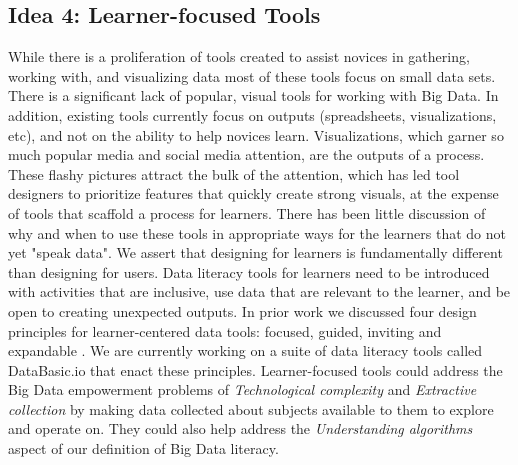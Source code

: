 \documentclass{sig-alternate}
\begin{document}
\subsection{Idea 4: Learner-focused Tools}
While there is a proliferation of tools created to assist novices in gathering, working with, and visualizing data \cite{tachtech_visualizing_2014,netstories_2015} most of these tools focus on small data sets. There is a significant lack of popular, visual tools for working with Big Data. In addition, existing tools currently focus on outputs (spreadsheets, visualizations, etc), and not on the ability to help novices learn. Visualizations, which garner so much popular media and social media attention, are the outputs of a process. These flashy pictures attract the bulk of the attention, which has led tool designers to prioritize features that quickly create strong visuals, at the expense of tools that scaffold a process for learners. There has been little discussion of why and when to use these tools in appropriate ways for the learners that do not yet "speak data". We assert that designing for learners is fundamentally different than designing for users. Data literacy tools for learners need to be introduced with activities that are inclusive, use data that are relevant to the learner, and be open to creating unexpected outputs. In prior work we discussed four design principles for learner-centered data tools: focused, guided, inviting and expandable \cite{bhargava_designing_2015}. We are currently working on a suite of data literacy tools called DataBasic.io that enact these principles. Learner-focused tools could address the Big Data empowerment problems of \textit{Technological complexity} and \textit{Extractive collection} by making data collected about subjects available to them to explore and operate on. They could also help address the \textit{Understanding algorithms} aspect of our definition of Big Data literacy. 
\end{document}
